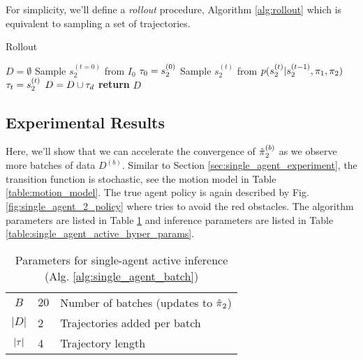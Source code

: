 For simplicity, we'll define a \emph{rollout} procedure, Algorithm \ref{alg:rollout} which is equivalent to sampling a set of trajectories.

	\begin{algorithm}
	\caption{Rollout}
	\label{alg:rollout}
	\begin{algorithmic}[1]
		\State $D=\emptyset$
		\State Sample $s_2^{(t=0)}$ from $I_0$
		\State $\tau_0 = s_2^{(0)}$
		\State Sample $s_2^{(t)}$ from $p(s_2^{(t)}|s_2^{(t-1)},\pi_{1}, \pi_{2})$
		\State $\tau_t = s_2^{(t)}$
		\EndFor
		\State $D = D\cup \tau_d$
		\EndFor
		\State \textbf{return} $D$
		\EndProcedure
	\end{algorithmic}
\end{algorithm}


\subsection{Experimental Results}

Here, we'll show that we can accelerate the convergence of $\hat{\pi_{}}_2^{(b)}$ as we observe more batches of data $D^{(b)}$. Similar to Section \ref{sec:single_agent_experiment}, the transition function is stochastic, see the motion model in Table \ref{table:motion_model}. The true agent policy is again described by Fig. \ref{fig:single_agent_2_policy} where  tries to avoid the red obstacles. The algorithm parameters are listed in Table \ref{table:single_agent_active_alg_params_short} and inference parameters are listed in Table \ref{table:single_agent_active_hyper_params}.

    \begin{table}[htb]
	\centering
	\begin{tabular}{c|l l}
		$B$ & $20$ & Number of batches (updates to $\hat{\pi_{}}_2$)\\
		$|D|$ & 2 & Trajectories added per batch \\
		$|\tau|$ & 4 & Trajectory length \\
	\end{tabular}
	\caption{Parameters for single-agent active inference (Alg. \ref{alg:single_agent_batch})}
	\label{table:single_agent_active_alg_params_short}
\end{table}


